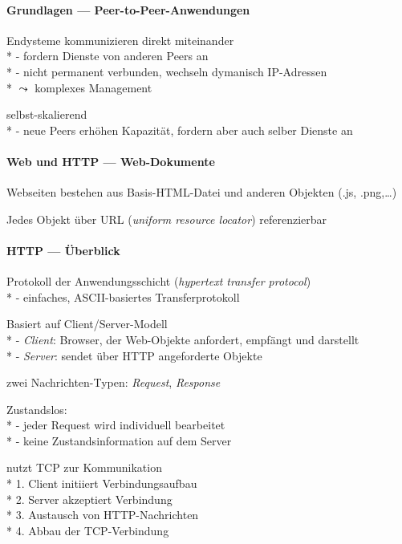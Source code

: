 \paragraph{Grundlagen --- Peer-to-Peer-Anwendungen}
\begin{items}
  \item Endysteme kommunizieren direkt miteinander \\*
    - fordern Dienste von anderen Peers an \\*
    - nicht permanent verbunden, wechseln dymanisch IP-Adressen \\*
    \phantom{-} \( \leadsto \) komplexes Management
  \item selbst-skalierend \\*
    - neue Peers erhöhen Kapazität, fordern aber auch selber Dienste an
\end{items}

\paragraph{Web und HTTP --- Web-Dokumente}
\begin{items}
  \item Webseiten bestehen aus Basis-HTML-Datei und anderen Objekten (.js, .png,\dots)
  \item Jedes Objekt über URL (\emph{uniform resource locator}) referenzierbar
\end{items}

\paragraph{HTTP --- Überblick}
\begin{items}
  \item Protokoll der Anwendungsschicht (\emph{hypertext transfer protocol}) \\*
    - einfaches, ASCII-basiertes Transferprotokoll
  \item Basiert auf Client/Server-Modell \\*
    - \emph{Client}: Browser, der Web-Objekte anfordert, empfängt und darstellt \\*
    - \emph{Server}: sendet über HTTP angeforderte Objekte
  \item zwei Nachrichten-Typen: \emph{Request}, \emph{Response}
  \item Zustandslos: \\*
    - jeder Request wird individuell bearbeitet \\*
    - keine Zustandsinformation auf dem Server
  \item nutzt TCP zur Kommunikation \\*
    1. Client initiiert Verbindungsaufbau \\*
    2. Server akzeptiert Verbindung \\*
    3. Austausch von HTTP-Nachrichten \\*
    4. Abbau der TCP-Verbindung
\end{items}

